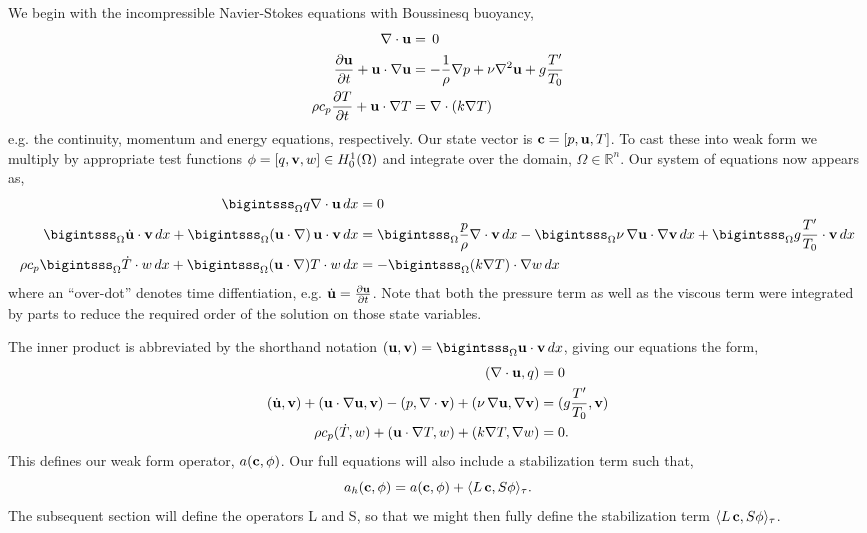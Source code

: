 We begin with the incompressible Navier-Stokes equations with Boussinesq
buoyancy,
\begin{align}
 \nabla \cdot {\bf u} &= \, 0 \label{eq_cont}\\
 \frac{\partial {\bf u}}{\partial t} + {\bf u} \cdot \nabla {\bf u} &= -\frac{1}{\rho}
 \nabla p + \nu \nabla^2 {\bf u} + g \frac{T'}{T_0} \label{eq_mom}\\
 \rho c_p \frac{\partial T}{\partial t} + {\bf u} \cdot \nabla T &= \nabla
 \cdot (k \nabla T) \label{eq_energy}
\end{align}
e.g. the continuity, momentum and energy equations, respectively. Our 
state vector is ${\bf c} =  \left[p,{\bf u},T \right]$. To cast these into
weak form we multiply by appropriate test 
functions ${\bf \phi} = \left[q,{\bf v},w \right] \in H^1_0(\Omega)$ and
integrate over the domain, $\Omega \in \mathbb{R}^n$. Our system of
equations now appears as, 
\begin{align}
  \bigintsss_\Omega q \nabla \cdot {\bf u} \, dx &= 0 \\
 \bigintsss_\Omega \dot {\bf u} \cdot {\bf v} \, dx +
 \bigintsss_\Omega  ({\bf u} \cdot \nabla) \, {\bf u} \cdot {\bf v} \, dx &=
 \bigintsss_\Omega \frac{p}{\rho} \nabla \cdot {\bf v} \, dx -
 \bigintsss_\Omega \nu \, \nabla {\bf u} \cdot \nabla {\bf v}
 \,dx + \bigintsss_\Omega g \frac{T'}{T_0} \cdot {\bf v} \, dx \\ 
 \rho c_p \bigintsss_\Omega \dot T \cdot w \, dx + \bigintsss_\Omega ({\bf u}
 \cdot \nabla) T \cdot w \, dx  &= -\bigintsss_\Omega (k \nabla T) \cdot
 \nabla w \, dx
\end{align}
%
where an ``over-dot'' denotes time diffentiation, e.g. $\dot {\bf u} =
\frac{\partial {\bf u}}{\partial t}$. Note that both the pressure term as well
as the viscous term were integrated by parts to reduce the required
order of the solution on those state variables.  

The inner product is abbreviated by the shorthand notation $({\bf u},{\bf v}) =
\bigintsss_\Omega {\bf u}\cdot {\bf v}\, dx $, giving our equations the form,  
\begin{align}
 (\nabla \cdot {\bf u}, q) &= 0 \\
 (\dot {\bf u},{\bf v}) + ({\bf u} \cdot \nabla {\bf u}, {\bf v}) -
 (p,\nabla \cdot {\bf v}) + (\nu \, \nabla
 {\bf u}, \nabla {\bf v}) &= (g \frac{T'}{T_0},{\bf v}) \\
 \rho c_p (\dot T,w) + ({\bf u} \cdot \nabla T,w) + (k \nabla T,\nabla w) &= 0.
\end{align}
%
This defines our weak form operator, $ a({\bf c},{\bf \phi})$. Our full equations will
also include a stabilization term such that,  
\begin{equation}
 a_h({\bf c},{\bf \phi}) = a({\bf c},{\bf \phi}) +  \langle L\,{\bf c},S{\bf \phi} \rangle_\tau. 
\end{equation}
%
The subsequent section will define the operators L and S, so that we
might then fully define the stabilization term $\langle L\,{\bf c},S{\bf \phi}
\rangle_\tau$. 

